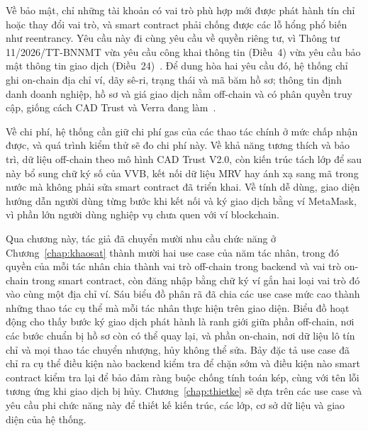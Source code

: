 Về bảo mật, chỉ những tài khoản có vai trò phù hợp mới được phát hành tín chỉ hoặc thay đổi vai trò, và smart contract phải chống được các lỗ hổng phổ biến như reentrancy. Yêu cầu này đi cùng yêu cầu về quyền riêng tư, vì Thông tư 11/2026/TT-BNNMT vừa yêu cầu công khai thông tin (Điều~4) vừa yêu cầu bảo mật thông tin giao dịch (Điều~24)~\cite{vietnam2026thongtu11}. Để dung hòa hai yêu cầu đó, hệ thống chỉ ghi on-chain địa chỉ ví, dãy sê-ri, trạng thái và mã băm hồ sơ; thông tin định danh doanh nghiệp, hồ sơ và giá giao dịch nằm off-chain và có phân quyền truy cập, giống cách CAD Trust và Verra đang làm~\cite{cadtrust2025datamodel,verra2020registryv2}.

Về chi phí, hệ thống cần giữ chi phí gas của các thao tác chính ở mức chấp nhận được, và quá trình kiểm thử sẽ đo chi phí này. Về khả năng tương thích và bảo trì, dữ liệu off-chain theo mô hình CAD Trust V2.0, còn kiến trúc tách lớp để sau này bổ sung chữ ký số của VVB, kết nối dữ liệu MRV hay ánh xạ sang mã trong nước mà không phải sửa smart contract đã triển khai. Về tính dễ dùng, giao diện hướng dẫn người dùng từng bước khi kết nối và ký giao dịch bằng ví MetaMask, vì phần lớn người dùng nghiệp vụ chưa quen với ví blockchain.

Qua chương này, tác giả đã chuyển mười nhu cầu chức năng ở Chương~\ref{chap:khaosat} thành mười hai use case của năm tác nhân, trong đó quyền của mỗi tác nhân chia thành vai trò off-chain trong backend và vai trò on-chain trong smart contract, còn đăng nhập bằng chữ ký ví gắn hai loại vai trò đó vào cùng một địa chỉ ví. Sáu biểu đồ phân rã đã chia các use case mức cao thành những thao tác cụ thể mà mỗi tác nhân thực hiện trên giao diện. Biểu đồ hoạt động cho thấy bước ký giao dịch phát hành là ranh giới giữa phần off-chain, nơi các bước chuẩn bị hồ sơ còn có thể quay lại, và phần on-chain, nơi dữ liệu lô tín chỉ và mọi thao tác chuyển nhượng, hủy không thể sửa. Bảy đặc tả use case đã chỉ ra cụ thể điều kiện nào backend kiểm tra để chặn sớm và điều kiện nào smart contract kiểm tra lại để bảo đảm ràng buộc chống tính toán kép, cùng với tên lỗi tương ứng khi giao dịch bị hủy. Chương~\ref{chap:thietke} sẽ dựa trên các use case và yêu cầu phi chức năng này để thiết kế kiến trúc, các lớp, cơ sở dữ liệu và giao diện của hệ thống.
